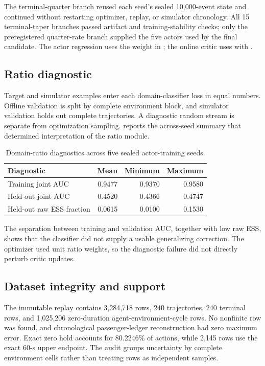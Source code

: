 The terminal-quarter branch reused each seed's sealed 10,000-event state and
continued without restarting optimizer, replay, or simulator chronology. All
15 terminal-taper branches passed artifact and training-stability checks; only
the preregistered quarter-rate branch supplied the five actors used by the
final candidate. The actor regression uses the weight in
; the online critic uses  with
.

\subsection{Ratio diagnostic}
\label{app:ratio}

Target and simulator examples enter each domain-classifier loss in equal
numbers. Offline validation is split by complete environment block, and
simulator validation holds out complete trajectories. A diagnostic random
stream is separate from optimization sampling.  reports
the across-seed summary that determined interpretation of the ratio module.

\begin{table}[t]
\centering
\small
\caption{Domain-ratio diagnostics across five sealed actor-training seeds.}
\label{tab:ratio_diag}
\begin{tabular}{lrrr}
\toprule
Diagnostic & Mean & Minimum & Maximum \\
\midrule
Training joint AUC & 0.9477 & 0.9370 & 0.9580 \\
Held-out joint AUC & 0.4520 & 0.4366 & 0.4747 \\
Held-out raw ESS fraction & 0.0615 & 0.0100 & 0.1530 \\
\bottomrule
\end{tabular}
\end{table}

The separation between training and validation AUC, together with low raw
ESS, shows that the classifier did not supply a usable
generalizing correction. The optimizer used unit ratio weights, so the
diagnostic failure did not directly perturb critic updates.

\subsection{Dataset integrity and support}
\label{app:support}

The immutable replay contains 3,284,718 rows, 240 trajectories, 240 terminal
rows, and 1,025,206 zero-duration agent-environment-cycle rows. No nonfinite row
was found, and chronological passenger-ledger reconstruction had zero maximum
error. Exact zero hold accounts for 80.2246\% of actions, while 2,145 rows use
the exact 60-s upper endpoint. The audit groups uncertainty by complete
environment cells rather than treating rows as independent samples.

